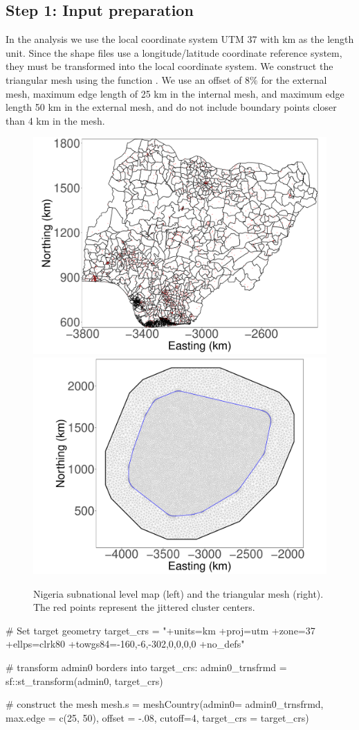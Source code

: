 \subsection{Step 1: Input preparation}
In the analysis we use the local coordinate system UTM 37 with km as the length unit. Since the shape files use a longitude/latitude coordinate reference system, they must be transformed into the local coordinate system. 
We construct the triangular mesh using the function .  We use an offset of $8\%$ for the external mesh, maximum edge length of 25 km in the internal mesh, and maximum edge length 50 km in the external mesh, and do not include boundary points closer than 4 km in the mesh.
\begin{figure}
\centering
\includegraphics[width=.48\textwidth]{map.pdf}  
\includegraphics[width=.48\textwidth]{mesh.pdf}
\caption{Nigeria subnational level map (left) and the triangular mesh (right). The red points represent the jittered cluster centers.}
\label{fig:meshAndCountry}
\end{figure}


\begin{example}
# Set target geometry
target_crs = "+units=km +proj=utm +zone=37 +ellps=clrk80 
              +towgs84=-160,-6,-302,0,0,0,0 +no_defs"

# transform admin0 borders into target_crs: 
admin0_trnsfrmd = sf::st_transform(admin0, target_crs)

# construct the mesh
mesh.s = meshCountry(admin0= admin0_trnsfrmd,
                     max.edge = c(25, 50),
                     offset = -.08, cutoff=4,
                     target_crs = target_crs)
\end{example}

